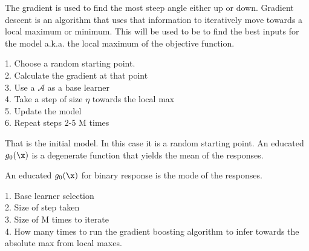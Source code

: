 \documentclass[12pt]{article}
\begin{document}
\begin{enumerate}

The gradient is used to find the most steep angle either up or down. Gradient descent is an algorithm that uses that information to iteratively move towards a local maximum or minimum. This will be used to be to find the best inputs for the model a.k.a. the local maximum of the objective function. 


1. Choose a random starting point.
\\2. Calculate the gradient at that point
\\3. Use a  $\mathcal{A}$ as a base learner
\\4. Take a step of size $\eta$ towards the local max
\\5. Update the model
\\6. Repeat steps 2-5 M times


That is the initial model. In this case it is a random starting point. An educated $g_0(\x)$ is a degenerate function that yields the mean of the responses.


An educated $g_0(\x)$ for binary response is the mode of the responses. 


1. Base learner selection
\\2. Size of step taken
\\3. Size of M times to iterate
\\4. How many times to run the gradient boosting algorithm to infer towards the absolute max from local maxes. 




\end{enumerate}
\end{document}
